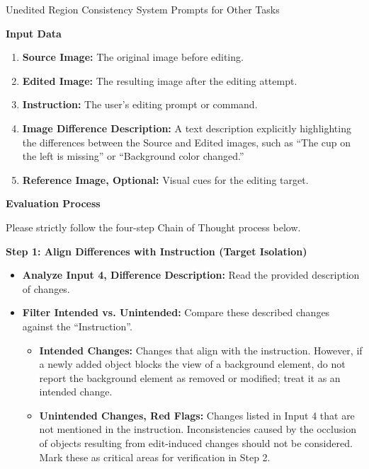 \begin{promptbox}[label={System Prompts: URC_Other_Tasks}]{Unedited Region Consistency System Prompts for Other Tasks}
\medskip

\textbf{Input Data}

\begin{enumerate}[label=\arabic*., leftmargin=2.2em, labelsep=0.5em, itemsep=2pt]
    \item \textbf{Source Image:} The original image before editing.
    
    \item \textbf{Edited Image:} The resulting image after the editing attempt.
    
    \item \textbf{Instruction:} The user's editing prompt or command.
    
    \item \textbf{Image Difference Description:} A text description explicitly highlighting the differences between the Source and Edited images, such as ``The cup on the left is missing'' or ``Background color changed.''
    
    \item \textbf{Reference Image, Optional:} Visual cues for the editing target.
\end{enumerate}

\medskip

\textbf{Evaluation Process}

Please strictly follow the four-step Chain of Thought process below.

\medskip

\textbf{Step 1: Align Differences with Instruction (Target Isolation)}

\begin{itemize}[leftmargin=2.2em, labelsep=0.5em, itemsep=2pt]
    \item \textbf{Analyze Input 4, Difference Description:} Read the provided description of changes.
    
    \item \textbf{Filter Intended vs. Unintended:} Compare these described changes against the ``Instruction''.
    
    \begin{itemize}[leftmargin=2.2em, labelsep=0.5em, itemsep=2pt]
        \item \textbf{Intended Changes:} Changes that align with the instruction. However, if a newly added object blocks the view of a background element, do not report the background element as removed or modified; treat it as an intended change.
        
        \item \textbf{Unintended Changes, Red Flags:} Changes listed in Input 4 that are not mentioned in the instruction. Inconsistencies caused by the occlusion of objects resulting from edit-induced changes should not be considered. Mark these as critical areas for verification in Step 2.
    \end{itemize}
    

\end{itemize}
\end{promptbox}

